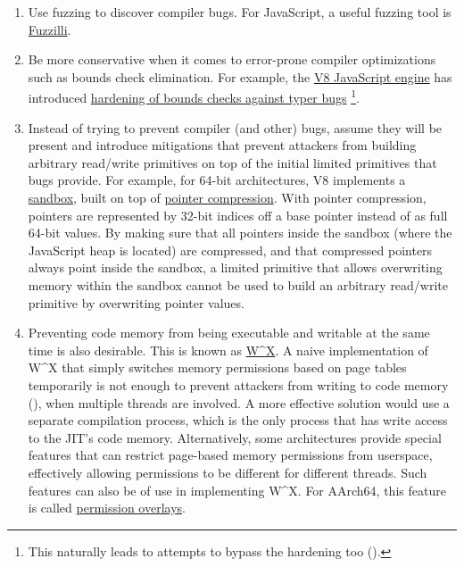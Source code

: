 \documentclass[
  a4paper,
]{report}
\providecommand{\tightlist}{%
  \setlength{\itemsep}{0pt}\setlength{\parskip}{0pt}}
\begin{document}
\begin{enumerate}
\def\labelenumi{\arabic{enumi}.}
\tightlist
\item
  Use fuzzing to discover compiler bugs. For JavaScript, a useful
  fuzzing tool is
  \href{https://github.com/googleprojectzero/fuzzilli}{Fuzzilli}.
\item
  Be more conservative when it comes to error-prone compiler
  optimizations such as bounds check elimination. For example, the
  \href{https://v8.dev/}{V8 JavaScript engine} has introduced
  \href{https://bugs.chromium.org/p/v8/issues/detail?id=8806}{hardening
  of bounds checks against typer bugs} \footnote{This naturally leads to
    attempts to bypass the hardening too
    ().}.
\item
  Instead of trying to prevent compiler (and other) bugs, assume they
  will be present and introduce mitigations that prevent attackers from
  building arbitrary read/write primitives on top of the initial limited
  primitives that bugs provide. For example, for 64-bit architectures,
  V8 implements a
  \href{https://docs.google.com/document/d/1FM4fQmIhEqPG8uGp5o9A-mnPB5BOeScZYpkHjo0KKA8/edit}{sandbox},
  built on top of
  \href{https://v8.dev/blog/pointer-compression}{\label{__index_entry_97}{pointer
  compression}}. With pointer compression,
  pointers are represented by 32-bit indices off a base pointer instead
  of as full 64-bit values. By making sure that all pointers inside the
  sandbox (where the JavaScript heap is located) are compressed, and
  that compressed pointers always point inside the sandbox, a limited
  primitive that allows overwriting memory within the sandbox cannot be
  used to build an arbitrary read/write primitive by overwriting pointer
  values.
\item
  Preventing code memory from being executable and writable at the same
  time is also desirable. This is known as
  \href{https://en.wikipedia.org/wiki/W\%5EX}{\label{__index_entry_98}{W\^{}X}}.
  A naive implementation of W\^{}X that simply switches memory
  permissions based on page tables temporarily is not enough to prevent
  attackers from writing to code memory (), when multiple threads are involved. A more effective
  solution would use a separate compilation process, which is the only
  process that has write access to the JIT's code memory. Alternatively,
  some architectures provide special features that can restrict
  page-based memory permissions from userspace, effectively allowing
  permissions to be different for different threads. Such features can
  also be of use in implementing W\^{}X. For AArch64, this feature is
  called
  \href{https://developer.arm.com/documentation/102376/0200/Permission-indirection-and-permission-overlay-extensions}{permission
  overlays}.
\end{enumerate}
\end{document}

